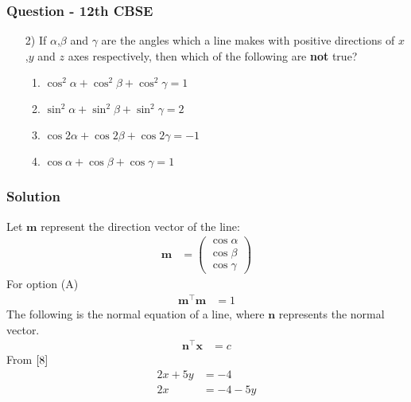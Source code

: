 \documentclass{beamer}
\begin{document}
\begin{frame}
\frametitle{Question - 12th CBSE}
\begin{enumerate}
    \item [2)]
If $\alpha$,$\beta$ and $\gamma$ are the angles which a line makes with positive directions of $x$,$y$ and $z$ axes respectively, then which of the following are \textbf{not} true?
    \begin{enumerate}
\item $\cos^2{\alpha} + \cos^2{\beta} + \cos^2{\gamma} = 1$
\item $\sin^2{\alpha} + \sin^2{\beta} + \sin^2{\gamma} = 2$
\item $\cos{2\alpha} + \cos{2\beta} + \cos{2\gamma} =-1$
\item $\cos{\alpha} + \cos{\beta} + \cos{\gamma} = 1$
\end{enumerate}
\end{enumerate}
\end{frame}





\begin{frame}
\frametitle{Solution}
Let $\textbf{m}$ represent the direction vector of the line:
\begin{align}
    \textbf{m} &= \begin{pmatrix}
        \cos{\alpha} \\
        \cos{\beta}\\
        \cos{\gamma}
    \end{pmatrix}
\end{align}
For option (A)
\begin{align}
\textbf{m}^{\top}\textbf{m} &= 1
\end{align}
The following is the normal equation of a line, where $\textbf{n}$ represents the normal vector.
\begin{align}
    \textbf{n}^{\top}\textbf{x} &= c
\end{align}
From $\eqref{8}$
\begin{align}
    2x + 5y &= -4\\
    2x &= -4 -5y
    \end{align}
\end{frame}
\end{document}
